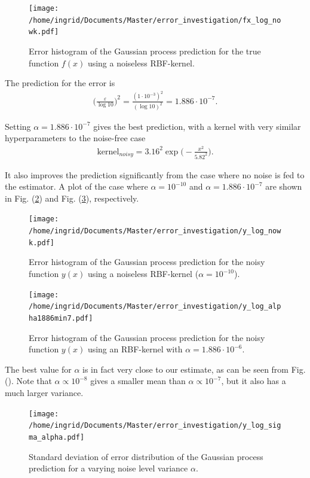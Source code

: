 \documentclass[twoside,english]{uiofysmaster}
\begin{document}
\begin{figure}
\centering
\texttt{[image: /home/ingrid/Documents/Master/error\_investigation/fx\_log\_nowk.pdf]}
\caption{Error histogram of the Gaussian process prediction for the true function $f(x)$ using a noiseless RBF-kernel.}
\label{Fig:: fx prediction no noise}
\end{figure}

The prediction for the error is
\begin{align*}
\Big( \frac{\varepsilon}{\log 10} \Big)^2 = \frac{(1 \cdot 10^{-3})^2}{(\log 10)^2} = 1.886 \cdot 10^{-7}.
\end{align*}

Setting $\alpha = 1.886 \cdot 10^{-7}$ gives the best prediction, with a kernel with very similar hyperparameters to the noise-free case
\begin{align}
\text{kernel}_{noisy} = 3.16^2 \exp \Big( - \frac{x^2}{5.82^2} \Big).
\end{align}

It also improves the prediction significantly from the case where no noise is fed to the estimator. A plot of the case where $\alpha = 10^{-10}$ and $\alpha = 1.886 \cdot 10^{-7}$ are shown in Fig. (\ref{Fig:: y prediction no noise}) and Fig. (\ref{Fig:: y prediction alpha=1.886}), respectively.

\begin{figure}
\centering
\texttt{[image: /home/ingrid/Documents/Master/error\_investigation/y\_log\_nowk.pdf]}
\caption{Error histogram of the Gaussian process prediction for the noisy function $y(x)$ using a noiseless RBF-kernel ($\alpha = 10^{-10}$).}
\label{Fig:: y prediction no noise}
\end{figure}

\begin{figure}
\centering
\texttt{[image: /home/ingrid/Documents/Master/error\_investigation/y\_log\_alpha1886min7.pdf]}
\caption{Error histogram of the Gaussian process prediction for the noisy function $y(x)$ using an RBF-kernel with $\alpha = 1.886 \cdot 10^{-6}$.}
\label{Fig:: y prediction alpha=1.886}
\end{figure}

The best value for $\alpha$ is in fact very close to our estimate, as can be seen from Fig. (). Note that $\alpha \propto 10^{-8}$ gives a smaller mean than $\alpha \propto 10^{-7}$, but it also has a much larger variance.

\begin{figure}
\centering
\texttt{[image: /home/ingrid/Documents/Master/error\_investigation/y\_log\_sigma\_alpha.pdf]}
\caption{Standard deviation of error distribution of the Gaussian process prediction for a varying noise level variance $\alpha$.}
\label{Fig:: y prediction alpha mu}
\end{figure}
\end{document}
